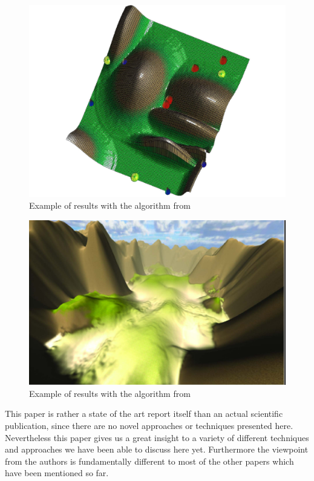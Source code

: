 \begin{figure}[htb]
	\centering
	\includegraphics[width=\linewidth]{RZL12/rthrhrh.jpg}
	\caption{Example of results with the algorithm from \cite{togelius2010towards}}
	\label{fig:tag23}
\end{figure}

\begin{figure}[htb]
	\centering
	\includegraphics[width=\linewidth]{RZL12/sjrjsrtr6zsr6z.jpg}
	\caption{Example of results with the algorithm from \cite{raffe2011evolving}}
	\label{fig:tag25}
\end{figure}

This paper \cite{raffe2012survey} is rather a state of the art report itself than an actual scientific publication, since there are no novel approaches or techniques presented here. Nevertheless this paper gives us a great insight to a variety of different techniques and approaches we have been able to discuss here yet. Furthermore the viewpoint from the authors is fundamentally different to most of the other papers which have been mentioned so far.

